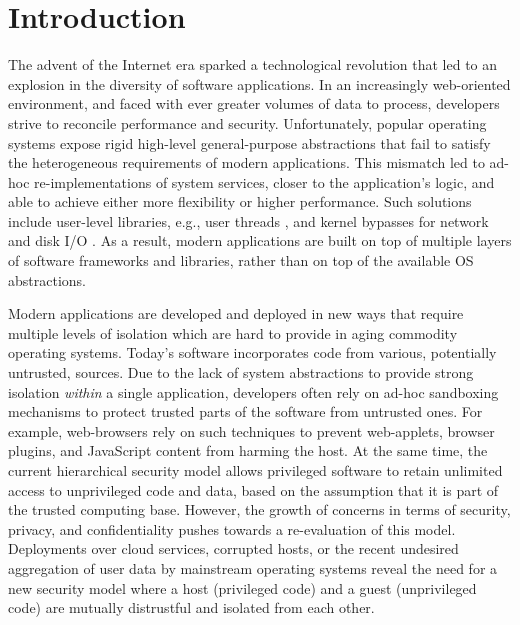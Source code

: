 \section{Introduction}

The advent of the Internet era sparked a technological revolution that led to an explosion in the diversity of software applications.
In an increasingly web-oriented environment, and faced with ever greater volumes of data to process, developers strive to reconcile performance and security.
Unfortunately, popular operating systems expose rigid high-level general-purpose abstractions that fail to satisfy the heterogeneous requirements of modern applications.
This mismatch led to ad-hoc re-implementations of system services, closer to the application's logic, and able to achieve either more flexibility or higher performance.
Such solutions include user-level libraries, e.g., user threads \cite{golang}, and kernel bypasses for network and disk I/O \cite{DBLP:conf/nsdi/NanavatiWW17,intel2014data,intel2016storage,BelayPKGKB14}.
As a result, modern applications are built on top of multiple layers of software frameworks and libraries, rather than on top of the available OS abstractions.

Modern applications are developed and deployed in new ways that require multiple levels of isolation which are hard to provide in aging commodity operating systems.
Today's software incorporates code from various, potentially untrusted, sources.
Due to the lack of system abstractions to provide strong isolation \emph{within} a single application, developers often rely on ad-hoc sandboxing mechanisms to protect trusted parts of the software from untrusted ones.
For example, web-browsers rely on such techniques to prevent web-applets, browser plugins, and JavaScript content from harming the host.
At the same time, the current hierarchical security model allows privileged software to retain unlimited access to unprivileged code and data, based on the assumption that it is part of the trusted computing base.
However, the growth of concerns in terms of security, privacy, and confidentiality pushes towards a re-evaluation of this model.
Deployments over cloud services, corrupted hosts, or the recent undesired aggregation of user data by mainstream operating systems \cite{microsoftspy} reveal the need for a new security model where a host (privileged code) and a guest (unprivileged code) are mutually distrustful and isolated from each other.

